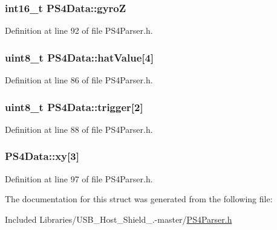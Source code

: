 \hypertarget{struct_p_s4_data_ace15cafba1570d56951e7db7947ba94c}{
\subsubsection[{gyro\-Z}]{\setlength{\rightskip}{0pt plus 5cm}int16\-\_\-t {\bf \-P\-S4\-Data\-::gyro\-Z}}}\label{struct_p_s4_data_ace15cafba1570d56951e7db7947ba94c}


\-Definition at line 92 of file \-P\-S4\-Parser.\-h.

\hypertarget{struct_p_s4_data_aa004cc456c79269dec99a9eed667484d}{
\subsubsection[{hat\-Value}]{\setlength{\rightskip}{0pt plus 5cm}uint8\-\_\-t {\bf \-P\-S4\-Data\-::hat\-Value}\mbox{[}4\mbox{]}}}\label{struct_p_s4_data_aa004cc456c79269dec99a9eed667484d}


\-Definition at line 86 of file \-P\-S4\-Parser.\-h.

\hypertarget{struct_p_s4_data_aad2133de0113cee402cda4a8c7e8b6a5}{
\subsubsection[{trigger}]{\setlength{\rightskip}{0pt plus 5cm}uint8\-\_\-t {\bf \-P\-S4\-Data\-::trigger}\mbox{[}2\mbox{]}}}\label{struct_p_s4_data_aad2133de0113cee402cda4a8c7e8b6a5}


\-Definition at line 88 of file \-P\-S4\-Parser.\-h.

\hypertarget{struct_p_s4_data_a1cfd90d32bbd9233dae34fb148fc9f56}{
\subsubsection[{xy}]{ {\bf \-P\-S4\-Data\-::xy}\mbox{[}3\mbox{]}}}\label{struct_p_s4_data_a1cfd90d32bbd9233dae34fb148fc9f56}


\-Definition at line 97 of file \-P\-S4\-Parser.\-h.



\-The documentation for this struct was generated from the following file\-:\begin{DoxyCompactItemize}
\item 
\-Included Libraries/\-U\-S\-B\-\_\-\-Host\-\_\-\-Shield\-\_.-\/master/\hyperlink{_p_s4_parser_8h}{\-P\-S4\-Parser.\-h}\end{DoxyCompactItemize}
